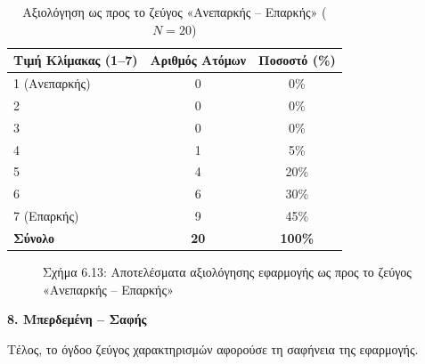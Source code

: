 \documentclass[twoside, a4paper, 11pt]{article}
\begin{document}
\begin{table}[H]
    \centering
    \caption{Αξιολόγηση ως προς το ζεύγος «Ανεπαρκής – Επαρκής» ($N = 20$)}
    \begin{tabular}{|l|c|c|}
        \hline
        \textbf{Τιμή Κλίμακας (1–7)} & \textbf{Αριθμός Ατόμων} & \textbf{Ποσοστό (\%)} \\ \hline
        1 (Ανεπαρκής) & 0 & 0\% \\ \hline
        2 & 0 & 0\% \\ \hline
        3 & 0 & 0\% \\ \hline
        4 & 1 & 5\% \\ \hline
        5 & 4 & 20\% \\ \hline
        6 & 6 & 30\% \\ \hline
        7 (Επαρκής) & 9 & 45\% \\ \hline
        \textbf{Σύνολο} & \textbf{20} & \textbf{100\%} \\ \hline
    \end{tabular}
\end{table}

\begin{figure}[H]
    \centering
    \caption{Σχήμα 6.13: Αποτελέσματα αξιολόγησης εφαρμογής ως προς το ζεύγος «Ανεπαρκής – Επαρκής»}
\end{figure}

\vspace{1em}
\noindent\textbf{8. Μπερδεμένη – Σαφής}

Τέλος, το όγδοο ζεύγος χαρακτηρισμών αφορούσε τη σαφήνεια της εφαρμογής.
\end{document}
